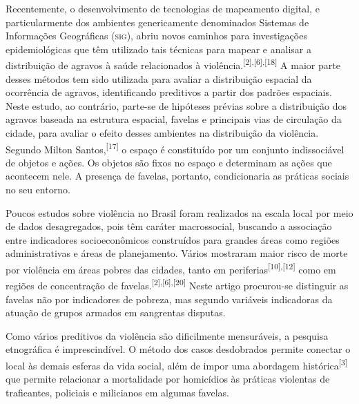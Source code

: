 \documentclass{article}
\begin{document}
Recentemente, o desenvolvimento de tecnologias de mapeamento digital, e
particularmente dos ambientes genericamente denominados Sistemas de Informações
Geográficas (\textsc{sig}), abriu novos caminhos para investigações epidemiológicas que
têm utilizado tais técnicas para mapear e analisar a distribuição de agravos à
saúde relacionados à violência.\textsuperscript{[}\textsuperscript{2}\textsuperscript{]}\textsuperscript{,}\textsuperscript{[}\textsuperscript{6}\textsuperscript{]}\textsuperscript{,}\textsuperscript{[}\textsuperscript{18}\textsuperscript{]}
A maior parte desses métodos tem sido utilizada para avaliar a distribuição
espacial da ocorrência de agravos, identificando preditivos a partir dos padrões
espaciais. Neste estudo, ao contrário, parte-se de hipóteses prévias sobre a
distribuição dos agravos baseada na estrutura espacial, favelas e principais
vias de circulação da cidade, para avaliar o efeito desses ambientes na
distribuição da violência. Segundo Milton
Santos,\textsuperscript{[}\textsuperscript{17}\textsuperscript{]}
o espaço é constituído por um conjunto indissociável de objetos e ações. Os
objetos são fixos no espaço e determinam as ações que acontecem nele. A presença
de favelas, portanto, condicionaria as práticas sociais no seu entorno.

Poucos estudos sobre violência no Brasil foram realizados na escala local por
meio de dados desagregados, pois têm caráter macrossocial, buscando a associação
entre indicadores socioeconômicos construídos para grandes áreas como regiões
administrativas e áreas de planejamento. Vários mostraram maior risco de morte
por violência em áreas pobres das cidades, tanto em
periferias\textsuperscript{[}\textsuperscript{10}\textsuperscript{]}\textsuperscript{,}\textsuperscript{[}\textsuperscript{12}\textsuperscript{]}
como em regiões de concentração de
favelas.\textsuperscript{[}\textsuperscript{2}\textsuperscript{]}\textsuperscript{,}\textsuperscript{[}\textsuperscript{6}\textsuperscript{]}\textsuperscript{,}\textsuperscript{[}\textsuperscript{20}\textsuperscript{]}
Neste artigo procurou-se distinguir as favelas não por indicadores de pobreza,
mas segundo variáveis indicadoras da atuação de grupos armados em sangrentas
disputas.

Como vários preditivos da violência são dificilmente mensuráveis, a pesquisa
etnográfica é imprescindível. O método dos casos desdobrados permite conectar o
local às demais esferas da vida social, além de impor uma abordagem
histórica\textsuperscript{[}\textsuperscript{3}\textsuperscript{]}
que permite relacionar a mortalidade por homicídios às práticas violentas de
traficantes, policiais e milicianos em algumas favelas.
\end{document}
